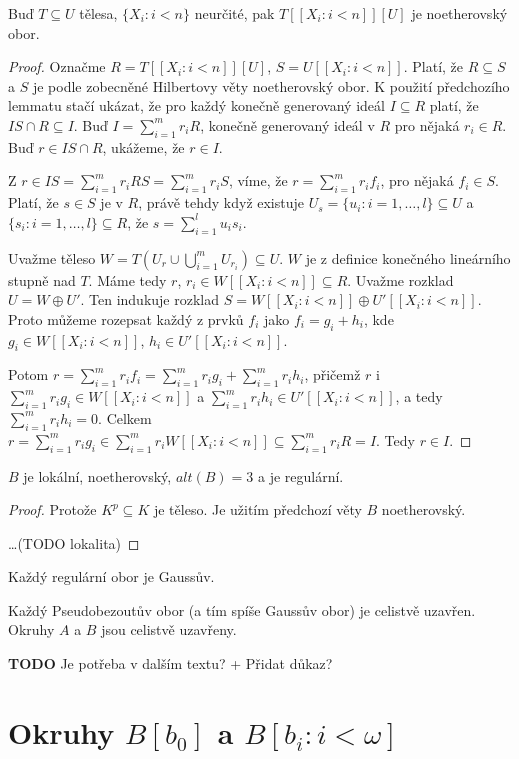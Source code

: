 \documentclass[11pt,a4paper]{article}
\theoremstyle{definition}
\theoremstyle{plain}
\begin{document}
\lemma Buď $T \subseteq U$ tělesa, $\{X_i: i < n\}$ neurčité, pak $T[[X_i: i <
n]][U]$ je noetherovský obor.
\begin{proof}
	Označme $R = T[[X_i: i < n]][U]$, $S = U[[X_i: i < n]]$. Platí, že $R
	\subseteq S$ a $S$ je podle zobecněné Hilbertovy věty noetherovský obor. K
	použití předchozího lemmatu stačí ukázat, že pro každý konečně generovaný
	ideál $I \subseteq R$ platí, že $IS \cap R \subseteq I$. Buď $I = \sum_{i =
	1}^m r_i R$, konečně generovaný ideál v $R$ pro nějaká $r_i \in R$. Buď $r
	\in IS \cap R$, ukážeme, že $r \in I$.

	Z $r \in IS = \sum_{i = 1}^m r_i RS = \sum_{i = 1}^m r_i S$, víme, že $r =
	\sum_{i = 1}^m r_i f_i$, pro nějaká $f_i \in S$. Platí, že $s \in S$ je v
	$R$, právě tehdy když existuje $U_s = \{u_i: i = 1, \dots, l\} \subseteq U$
	a $\{s_i: i = 1, \dots, l\} \subseteq R$, že $s = \sum_{i = 1}^l u_i s_i$.

	Uvažme těleso $W = T(U_r \cup \bigcup_{i = 1}^m U_{r_i}) \subseteq U$. $W$ je
	z definice konečného lineárního stupně nad $T$. Máme tedy $r$, $r_i \in
	W[[X_i: i < n]] \subseteq R$. Uvažme rozklad $U = W \oplus U'$. Ten
	indukuje rozklad $S = W[[X_i: i < n]] \oplus U'[[X_i: i < n]]$. Proto
	můžeme rozepsat každý z prvků $f_i$ jako $f_i = g_i + h_i$, kde $g_i \in
	W[[X_i: i < n]]$, $h_i \in U'[[X_i: i < n]]$.

	Potom $r = \sum_{i = 1}^m r_i f_i = \sum_{i = 1}^m r_i g_i + \sum_{i = 1}^m
	r_i h_i$, přičemž $r$ i $\sum_{i = 1}^m r_i g_i \in W[[X_i: i < n]]$ a
	$\sum_{i = 1}^m r_i h_i \in U'[[X_i: i < n]]$, a tedy $\sum_{i = 1}^m r_i h_i
	= 0$. Celkem $r = \sum_{i = 1}^m r_i g_i \in \sum_{i = 1}^m r_i W[[X_i: i <
	n]] \subseteq \sum_{i = 1}^m r_i R = I$. Tedy $r \in I$.
\end{proof}

\veta $B$ je lokální, noetherovský, $alt(B) = 3$ a je regulární.
\begin{proof}
Protože $K^p \subseteq K$ je těleso. Je užitím předchozí věty $B$ noetherovský.

\dots (TODO lokalita)
\end{proof}

\tvrzeni[Fakt] Každý regulární obor je Gaussův.

\tvrzeni[Fakt] Každý Pseudobezoutův obor (a tím spíše Gaussův obor) je celistvě
uzavřen.
\dusledek Okruhy $A$ a $B$ jsou celistvě uzavřeny.

\textbf{TODO} Je potřeba v dalším textu? + Přidat důkaz?

\section{Okruhy $B[b_0]$ a $B[b_i : i < \omega]$}
\end{document}
